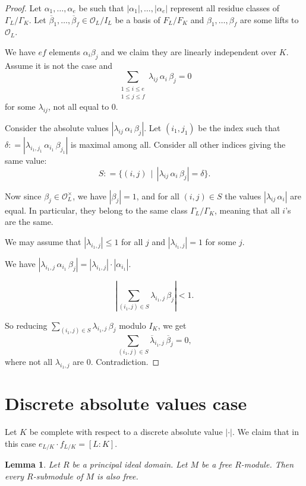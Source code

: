 \documentclass{article}
\newcommand{\dfn}{\mathrel{\mathop:}=}
\renewcommand{\O}{\mathcal{O}}
\theoremstyle{myplain}
\newtheorem{lemma}[proposition]{Lemma}
\theoremstyle{mydefinition}
\begin{document}
\begin{proof}
  Let $\alpha_1, \ldots, \alpha_e$ be such that $|\alpha_1|, \ldots, |\alpha_e|$
  represent all residue classes of $\Gamma_L / \Gamma_K$. Let
  $\overline{\beta}_1, \ldots, \overline{\beta}_f \in \O_L/I_L$ be a basis of
  $F_L/F_K$ and $\beta_1, \ldots, \beta_f$ are some lifts to $\O_L$.

  We have $e f$ elements $\alpha_i \beta_j$ and we claim they are linearly
  independent over $K$. Assume it is not the case and
  $$\sum_{\substack{1 \le i \le e \\ 1 \le j \le f}} \lambda_{ij} \, \alpha_i \, \beta_j = 0$$
  for some $\lambda_{ij}$, not all equal to $0$.

  Consider the absolute values $|\lambda_{ij} \, \alpha_i \, \beta_j|$.
  Let $(i_1, j_1)$ be the index such that
  $\delta \dfn |\lambda_{i_1, j_1} \, \alpha_{i_1} \, \beta_{j_1}|$ is maximal
  among all. Consider all other indices giving the same value:
  $$S \dfn \{ (i,j) \,\mid\, |\lambda_{ij} \, \alpha_i \, \beta_j| = \delta \}.$$

  Now since $\beta_j \in \O_L^\times$, we have $|\beta_j| = 1$, and for all
  $(i,j) \in S$ the values $|\lambda_{ij} \, \alpha_i|$ are equal. In
  particular, they belong to the same class $\Gamma_L/\Gamma_K$, meaning that
  all $i$'s are the same.

  We may assume that $|\lambda_{i_1, j}| \le 1$ for all $j$ and
  $|\lambda_{i_1, j}| = 1$ for some $j$.

  We have
  $|\lambda_{i_1, j} \, \alpha_{i_1} \, \beta_j| = |\lambda_{i_1,j}| \cdot
  |\alpha_{i_1}|$.

  \[ \left| \sum_{(i_1, j) \in S} \lambda_{i_1, j} \, \beta_j \right| < 1. \]

  So reducing $\sum_{(i_1, j) \in S} \lambda_{i_1, j} \, \beta_j$ modulo $I_K$,
  we get
  $$\sum_{(i_1, j) \in S} \overline{\lambda}_{i_1, j} \, \overline{\beta}_j = 0,$$
  where not all $\lambda_{i_1, j}$ are $0$. Contradiction.
\end{proof}

\section{Discrete absolute values case}

Let $K$ be complete with respect to a discrete absolute value $|\cdot|$. We
claim that in this case $e_{L/K}\cdot f_{L/K} = [L:K]$.

\begin{lemma}
  Let $R$ be a principal ideal domain. Let $M$ be a free $R$-module. Then every
  $R$-submodule of $M$ is also free.
\end{lemma}
\end{document}
